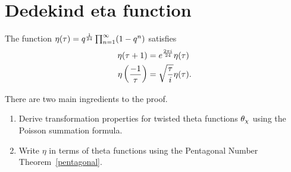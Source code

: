 \section{Dedekind eta function}
\begin{thm}\label{eta-transforms}
The function $\eta(\tau)=q^{\frac{1}{24}}\prod_{n=1}^{\infty} (1-q^n)$ satisfies
\begin{align*}
\eta(\tau+1)&=e^{\frac{2\pi i}{24}}\eta(\tau)\\
\eta\left( {\frac{-1}{\tau}} \right)&=\sqrt{\frac{\tau}{i}}\eta(\tau).
\end{align*}
\end{thm}
There are two main ingredients to the proof.
\begin{enumerate}
\item Derive transformation properties for twisted theta functions $\theta_{\chi}$ using the Poisson summation formula.
\item Write $\eta$ in terms of theta functions using the Pentagonal Number Theorem~\ref{pentagonal}.
\end{enumerate}
